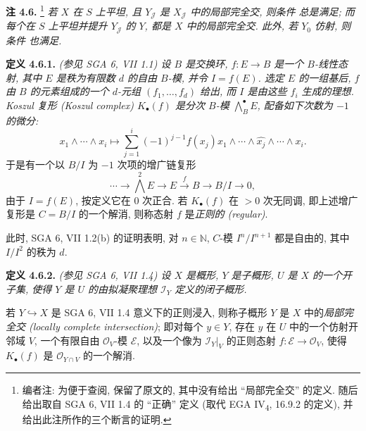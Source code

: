 \medskip
\noindent{}\textbf{注 4.6.}
\footnote{编者注: 为便于查阅, 保留了原文的,
其中没有给出 ``局部完全交'' 的定义.
随后给出取自 SGA 6, VII 1.4 的 ``正确'' 定义
(取代 EGA IV\textsubscript{4}, 16.9.2 的定义),
并给出此注所作的三个断言的证明.}
\textit{若 \(X\) 在 \(S\) 上平坦,
且 \(Y_{\mathscr J}\) 是 \(X_{\mathscr J}\) 中的局部完全交,
则条件  总是满足;
而每个在 \(S\) 上平坦并提升 \(Y_{\mathscr J}\) 的 \(Y\),
都是 \(X\) 中的局部完全交.
此外, 若 \(Y_0\) 仿射, 则条件  也满足.}

\medskip
\noindent{}\textbf{定义 4.6.1.}
\textit{(参见 SGA 6, VII 1.1) 设 \(B\) 是交换环,
\(f:E\to B\) 是一个 \(B\)-线性态射,
其中 \(E\) 是秩为有限数 \(d\) 的自由 \(B\)-模, 并令 \(I=f(E)\).
选定 \(E\) 的一组基后, \(f\) 由 \(B\) 的元素组成的一个
\(d\)-元组 \((f_1,\ldots,f_d)\) 给出,
而 \(I\) 是由这些 \(f_i\) 生成的理想.
\emph{Koszul 复形 (Koszul complex)} \(K_\bullet(f)\)
是分次 \(B\)-模 \(\bigwedge_B^\bullet E\),
配备如下次数为 \(-1\) 的微分:}
\[
 x_1\wedge\cdots\wedge x_i
 \longmapsto
 \sum_{j=1}^i(-1)^{j-1}f(x_j)
 x_1\wedge\cdots\wedge\widehat{x_j}\wedge\cdots\wedge x_i.
\]
于是有一个以 \(B/I\) 为 \(-1\) 次项的增广链复形
\[
 \cdots\longrightarrow\bigwedge^2 E\longrightarrow E
 \xrightarrow{f}B\longrightarrow B/I\longrightarrow0,
\]
由于 \(I=f(E)\), 按定义它在 \(0\) 次正合.
若 \(K_\bullet(f)\) 在 \(>0\) 次无同调,
即上述增广复形是 \(C=B/I\) 的一个解消,
则称态射 \(f\) 是\emph{正则的 (regular)}.

此时, SGA 6, VII 1.2(b) 的证明表明,
对 \(n\in\mathbb N\), \(C\)-模 \(I^n/I^{n+1}\) 都是自由的,
其中 \(I/I^2\) 的秩为 \(d\).

\medskip
\noindent{}\textbf{定义 4.6.2.}
\textit{(参见 SGA 6, VII 1.4) 设 \(X\) 是概形,
\(Y\) 是子概形, \(U\) 是 \(X\) 的一个开子集,
使得 \(Y\) 是 \(U\) 的由拟凝聚理想 \(\mathscr I_Y\) 定义的闭子概形.}

若 \(Y\hookrightarrow X\) 是 SGA 6, VII 1.4 意义下的正则浸入,
则称子概形 \(Y\) 是 \(X\) 中的\emph{局部完全交 (locally complete intersection)};
即对每个 \(y\in Y\), 存在 \(y\) 在 \(U\) 中的一个仿射开邻域 \(V\),
一个有限自由 \(\mathscr O_V\)-模 \(\mathscr E\),
以及一个像为 \(\mathscr I_Y|_V\) 的正则态射
\(f:\mathscr E\to\mathscr O_V\),
使得 \(K_\bullet(f)\) 是 \(\mathscr O_{Y\cap V}\) 的一个解消.

